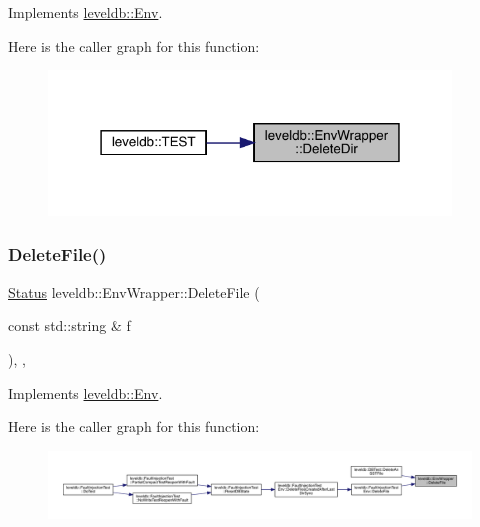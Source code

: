 Implements \mbox{\hyperlink{classleveldb_1_1_env_a4e1a1c4495541e426b146cba56c59627}{leveldb\+::\+Env}}.

Here is the caller graph for this function\+:
\nopagebreak
\begin{figure}[H]
\begin{center}
\leavevmode
\includegraphics[width=303pt]{classleveldb_1_1_env_wrapper_a819f58dc05225852813c0b7440edd719_icgraph}
\end{center}
\end{figure}
\mbox{\label{classleveldb_1_1_env_wrapper_ab409ec8ea8a969b007f6b939129f665a}} 
\subsubsection{\texorpdfstring{DeleteFile()}{DeleteFile()}}
{\footnotesize\ttfamily \mbox{\hyperlink{classleveldb_1_1_status}{Status}} leveldb\+::\+Env\+Wrapper\+::\+Delete\+File (\begin{DoxyParamCaption}\item[{const std\+::string \&}]{f }\end{DoxyParamCaption})\hspace{0.3cm}{\ttfamily [inline]}, {\ttfamily [override]}, {\ttfamily [virtual]}}



Implements \mbox{\hyperlink{classleveldb_1_1_env_ac956b984466d5f09309664177687f9af}{leveldb\+::\+Env}}.

Here is the caller graph for this function\+:
\nopagebreak
\begin{figure}[H]
\begin{center}
\leavevmode
\includegraphics[width=350pt]{classleveldb_1_1_env_wrapper_ab409ec8ea8a969b007f6b939129f665a_icgraph}
\end{center}
\end{figure}
\mbox{\label{classleveldb_1_1_env_wrapper_ae046fc226c039a8eb5d00c59eb0f47ba}} 
